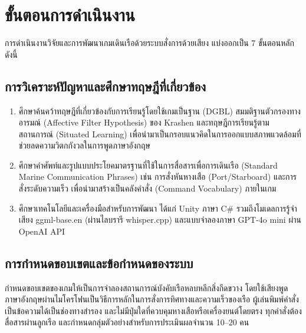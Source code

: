 
\section{ขั้นตอนการดำเนินงาน}

การดำเนินงานวิจัยและการพัฒนาเกมเดินเรือด้วยระบบสั่งการด้วยเสียง แบ่งออกเป็น 7 ขั้นตอนหลัก ดังนี้

\subsection{การวิเคราะห์ปัญหาและศึกษาทฤษฎีที่เกี่ยวข้อง}

\begin{enumerate}[label=(\arabic*)]
    \item ศึกษาค้นคว้าทฤษฎีที่เกี่ยวข้องกับการเรียนรู้โดยใช้เกมเป็นฐาน (DGBL) สมมติฐานตัวกรองทางอารมณ์ (Affective Filter Hypothesis) ของ Krashen และทฤษฎีการเรียนรู้ตามสถานการณ์ (Situated Learning) เพื่อนำมาเป็นกรอบแนวคิดในการออกแบบสภาพแวดล้อมที่ช่วยลดความวิตกกังวลในการพูดภาษาอังกฤษ
    \item ศึกษาคำศัพท์และรูปแบบประโยคมาตรฐานที่ใช้ในการสื่อสารเพื่อการเดินเรือ (Standard Marine Communication Phrases) เช่น การสั่งหันหางเสือ (Port/Starboard) และการสั่งระดับความเร็ว เพื่อนำมาสร้างเป็นคลังคำสั่ง (Command Vocabulary) ภายในเกม
    \item ศึกษาเทคโนโลยีและเครื่องมือสำหรับการพัฒนา ได้แก่ Unity ภาษา C\# รวมถึงโมเดลการรู้จำเสียง ggml-base.en (ผ่านไลบรารี whisper.cpp) และแบบจำลองภาษา GPT-4o mini ผ่าน OpenAI API
\end{enumerate}

\subsection{การกำหนดขอบเขตและข้อกำหนดของระบบ}

กำหนดขอบเขตของเกมให้เป็นการจำลองสถานการณ์บังคับเรือหลบหลีกสิ่งกีดขวาง โดยใช้เสียงพูดภาษาอังกฤษผ่านไมโครโฟนเป็นวิธีการหลักในการสั่งการทิศทางและความเร็วของเรือ ผู้เล่นพิมพ์คำสั่งเป็นข้อความได้เป็นช่องทางสำรอง และไม่มีปุ่มใดที่ควบคุมหางเสือหรือเครื่องยนต์โดยตรง ทุกคำสั่งต้องสื่อสารผ่านลูกเรือ และกำหนดกลุ่มตัวอย่างสำหรับการประเมินผลจำนวน 10--20 คน

